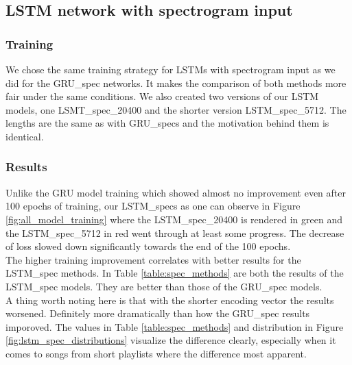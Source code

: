 \subsection{LSTM network with spectrogram input}

\subsubsection{Training}
We chose the same training strategy for LSTMs with spectrogram input as we did for the GRU\_spec networks. It makes the comparison of both methods more fair under the same conditions. We also created two versions of our LSTM models, one LSMT\_spec\_20400 and the shorter version LSTM\_spec\_5712. The lengths are the same as with GRU\_specs and the motivation behind them is identical.

\subsubsection{Results}
Unlike the GRU model training which showed almost no improvement even after 100 epochs of training, our LSTM\_specs as one can observe in Figure \ref{fig:all_model_training} where the LSTM\_spec\_20400 is rendered in green and the LSTM\_spec\_5712 in red went through at least some progress. The decrease of loss slowed down significantly towards the end of the 100 epochs. \\
The higher training improvement correlates with better results for the LSTM\_spec methods. In Table \ref{table:spec_methods} are both the results of the LSTM\_spec models. They are better than those of the GRU\_spec models. \\
A thing worth noting here is that with the shorter encoding vector the results worsened. Definitely more dramatically than how the GRU\_spec results imporoved. The values in Table \ref{table:spec_methods} and distribution in Figure \ref{fig:lstm_spec_distributions} visualize the difference clearly, especially when it comes to songs from short playlists where the difference most apparent.

